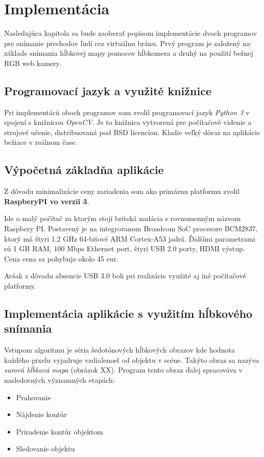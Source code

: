 \chapter{Implementácia}

Nasledujúca kapitola sa bude zaoberať popisom implementácie dvoch programov pre snímanie prechodov ľudí cez virtuálnu bránu. Prvý program je založený na základe snímania hĺbkovej mapy pomocov hĺbkomera a druhý  na použití bežnej RGB web kamery.

\section{Programovací jazyk a využité knižnice}
Pri implementácii oboch programov som zvolil programovací jazyk \textit{Python 3} v spojení s knižnicou \textit{OpenCV}. Je to knižnica vytvorená pre počítačové videnie a strojové učenie, distribuovaná pod BSD licenciou. Kladie veľký dôraz na aplikácie bežiace v reálnom čase. 

\section{Výpočetná základňa aplikácie}
Z dôvodu minimalizácie ceny zariadenia som ako primárnu platformu zvolil \textbf{RaspberyPI vo verzii 3}. 

Ide o malý počítač za ktorým stojí britská nadácia s rovnomenným názvom Raspbery PI. Postavený je na  integrovanom Broadcom SoC procesore BCM2837, ktorý má štyri 1.2 GHz 64-bitové ARM Cortex-A53 jadrá. Ďalšími parametrami sú 1 GB RAM, 100 Mbps Ethernet port, štyri USB 2.0 porty, HDMI výstup. Cena cena sa pohybuje okolo 45 eur. 

Avšak z dôvodu absencie USB 3.0 boli pri realizácie využité aj iné počítačové platformy.

\section{Implementácia aplikácie s využitím hĺbkového snímania}
Vstupom algoritmu je séria šedotónových hĺbkových obrazov kde hodnota každého pixelu vyjadruje vzdialenosť od objektu v scéne. Takýto obraz sa nazýva \textit{surová hĺbková mapa} (obrázok XX). Program tento obraz ďalej spracováva v nasledovných významných etapách: 

\begin{itemize}
\item Prahovanie
\item Nájdenie kontúr
\item Priradenie kontúr objektom
\item Sledovanie objektu 
\end{itemize}




